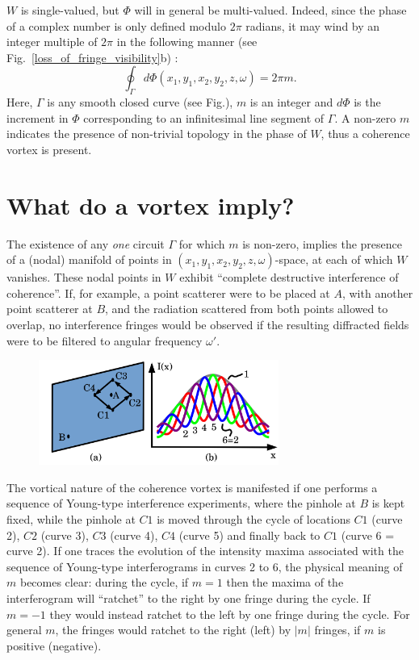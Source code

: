 \documentclass[a4paper,10pt]{article}
\begin{document}
 
$W$ is single-valued, but $\Phi$ will in general be multi-valued. Indeed, since the phase of a complex number is only defined modulo $2\pi$ radians, it may wind by an integer multiple of $2\pi$ in the following manner (see Fig.~\ref{loss_of_fringe_visibility}b) \cite{GburVisser2003}: 
\begin{equation}
\label{phase_of_W_winding}
\oint_{\Gamma} d\Phi(x_1,y_1,x_2,y_2,z,\omega)=2\pi m.
\end{equation}
Here, $\Gamma$ is any smooth closed curve (see Fig.), $m$ is an integer and $d\Phi$ is the increment in $\Phi$ corresponding to an infinitesimal line segment of $\Gamma$.
A non-zero $m$ indicates the presence of non-trivial topology in the phase of $W$, thus a coherence vortex \cite{GburVisser2003} is present.  

\section{What do a vortex imply?}

The existence of any {\em one} circuit $\Gamma$ for which $m$ is non-zero, implies the presence of a (nodal) manifold of points in $(x_1,y_1,x_2,y_2,z,\omega)$-space, at each of which $W$ vanishes. These nodal points in $W$ exhibit ``complete destructive interference of coherence''. If, for example, a point scatterer were to be placed at $A$, with another point scatterer at $B$, and the radiation scattered from both points allowed to overlap, no interference fringes would be observed if the resulting diffracted fields were to be filtered to angular frequency $\omega'$.

\begin{figure}\label{Young_fringe_anholonomy}
\includegraphics[width=0.7\textwidth]{Figures/Anholonomy.png}
\end{figure}
 
The vortical nature of the coherence vortex is manifested if one performs a sequence of Young-type interference experiments, where the pinhole at $B$ is kept fixed, while the pinhole at $C1$ is moved through the cycle of locations $C1$ (curve 2), $C2$ (curve 3), $C3$ (curve 4), $C4$ (curve 5) and finally back to $C1$ (curve 6 = curve 2). If one traces the evolution of the intensity maxima associated with the sequence of Young-type interferograms in curves 2 to 6, the physical meaning of $m$ becomes clear: during the cycle, if $m=1$ then the maxima of the interferogram will ``ratchet'' to the right by one fringe during the cycle. If $m=-1$ they would instead ratchet to the left by one fringe during the cycle.  For general $m$, the fringes would ratchet to the right (left) by $|m|$ fringes, if $m$ is positive (negative).
 
\end{document}
